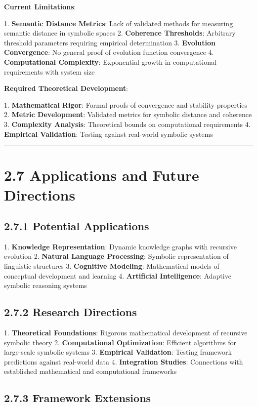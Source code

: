 \textbf{Current Limitations}:

1. \textbf{Semantic Distance Metrics}: Lack of validated methods for measuring semantic distance in symbolic spaces
2. \textbf{Coherence Thresholds}: Arbitrary threshold parameters requiring empirical determination
3. \textbf{Evolution Convergence}: No general proof of evolution function convergence
4. \textbf{Computational Complexity}: Exponential growth in computational requirements with system size

\textbf{Required Theoretical Development}:

1. \textbf{Mathematical Rigor}: Formal proofs of convergence and stability properties
2. \textbf{Metric Development}: Validated metrics for symbolic distance and coherence
3. \textbf{Complexity Analysis}: Theoretical bounds on computational requirements
4. \textbf{Empirical Validation}: Testing against real-world symbolic systems

\hrule

\section{2.7 Applications and Future Directions}

\subsection{2.7.1 Potential Applications}

1. \textbf{Knowledge Representation}: Dynamic knowledge graphs with recursive evolution
2. \textbf{Natural Language Processing}: Symbolic representation of linguistic structures
3. \textbf{Cognitive Modeling}: Mathematical models of conceptual development and learning
4. \textbf{Artificial Intelligence}: Adaptive symbolic reasoning systems

\subsection{2.7.2 Research Directions}

1. \textbf{Theoretical Foundations}: Rigorous mathematical development of recursive symbolic theory
2. \textbf{Computational Optimization}: Efficient algorithms for large-scale symbolic systems
3. \textbf{Empirical Validation}: Testing framework predictions against real-world data
4. \textbf{Integration Studies}: Connections with established mathematical and computational frameworks

\subsection{2.7.3 Framework Extensions}

